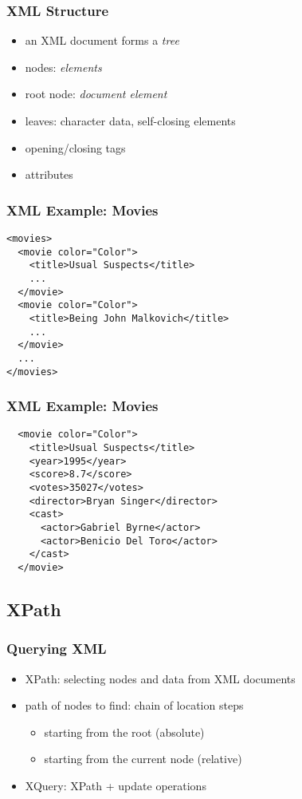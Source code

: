 \documentclass[dvipsnames]{beamer}
\theoremstyle{plain}
\begin{document}
\begin{frame}
  \frametitle{XML Structure}

  \begin{itemize}
    \item an XML document forms a \emph{tree}

    \item nodes: \emph{elements}
    \item root node: \emph{document element}
    \item leaves: character data, self-closing elements

    \pause
    \medskip
    \item opening/closing tags
    \item attributes
  \end{itemize}
\end{frame}

\begin{frame}[fragile]
  \frametitle{XML Example: Movies}

  \begin{lstlisting}
<movies>
  <movie color="Color">
    <title>Usual Suspects</title>
    ...
  </movie>
  <movie color="Color">
    <title>Being John Malkovich</title>
    ...
  </movie>
  ...
</movies>
  \end{lstlisting}
\end{frame}

\begin{frame}[fragile]
  \frametitle{XML Example: Movies}

  \begin{lstlisting}
  <movie color="Color">
    <title>Usual Suspects</title>
    <year>1995</year>
    <score>8.7</score>
    <votes>35027</votes>
    <director>Bryan Singer</director>
    <cast>
      <actor>Gabriel Byrne</actor>
      <actor>Benicio Del Toro</actor>
    </cast>
  </movie>
  \end{lstlisting}
\end{frame}

\subsection{XPath}

\begin{frame}
  \frametitle{Querying XML}

  \begin{itemize}
    \item XPath: selecting nodes and data from XML documents
    \item path of nodes to find: chain of location steps
    \begin{itemize}
      \item starting from the root (absolute)
      \item starting from the current node (relative)
    \end{itemize}

    \medskip
    \item XQuery: XPath + update operations
  \end{itemize}
\end{frame}
\end{document}
